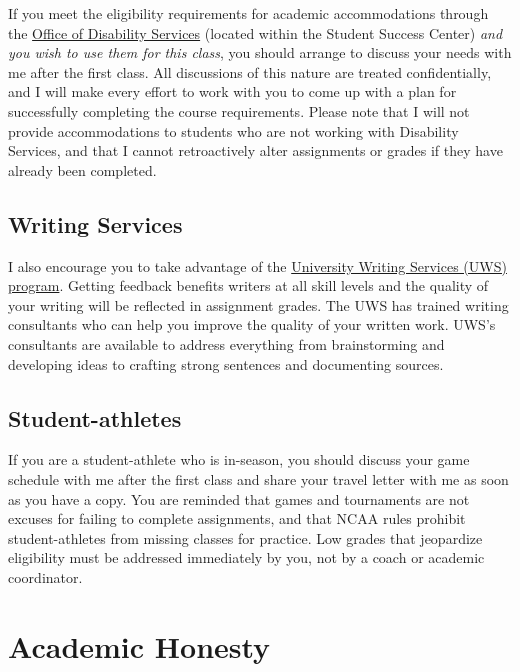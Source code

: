 \documentclass[]{book}
\begin{document}
If you meet the eligibility requirements for academic accommodations through the \href{https://www.slu.edu/life-at-slu/student-success-center/disability-services/index.php}{Office of Disability Services} (located within the Student Success Center) \emph{and you wish to use them for this class}, you should arrange to discuss your needs with me after the first class. All discussions of this nature are treated confidentially, and I will make every effort to work with you to come up with a plan for successfully completing the course requirements. Please note that I will not provide accommodations to students who are not working with Disability Services, and that I cannot retroactively alter assignments or grades if they have already been completed.

\hypertarget{writing-services}{%
\subsection{Writing Services}\label{writing-services}}

I also encourage you to take advantage of the \href{https://www.slu.edu/life-at-slu/student-success-center/academic-support/university-writing-services/index.php}{University Writing Services (UWS) program}. Getting feedback benefits writers at all skill levels and the quality of your writing will be reflected in assignment grades. The UWS has trained writing consultants who can help you improve the quality of your written work. UWS's consultants are available to address everything from brainstorming and developing ideas to crafting strong sentences and documenting sources.

\hypertarget{student-athletes}{%
\subsection{Student-athletes}\label{student-athletes}}

If you are a student-athlete who is in-season, you should discuss your game schedule with me after the first class and share your travel letter with me as soon as you have a copy. You are reminded that games and tournaments are not excuses for failing to complete assignments, and that NCAA rules prohibit student-athletes from missing classes for practice. Low grades that jeopardize eligibility must be addressed immediately by you, not by a coach or academic coordinator.

\hypertarget{academic-honesty}{%
\section{Academic Honesty}\label{academic-honesty}}
\end{document}
